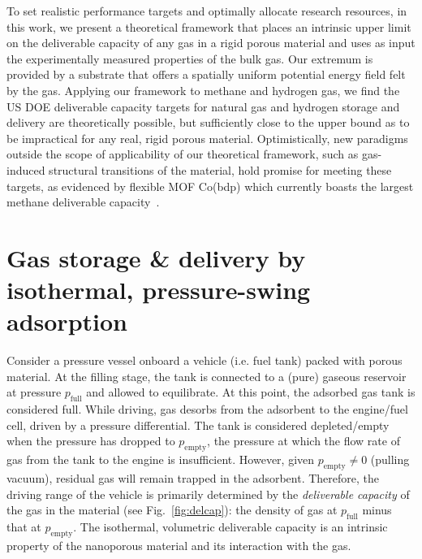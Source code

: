 \documentclass[twoside,twocolumn,9pt]{article}
\newcommand\pfull{\ensuremath{p_{\text{full}}}}
\newcommand\pempty{\ensuremath{p_{\text{empty}}}}
\begin{document}

To set realistic performance targets and optimally allocate research resources,
in this work, we present a theoretical framework that places an intrinsic upper
limit on the deliverable capacity of any gas in a rigid porous material and
uses as input the experimentally measured properties of the bulk gas. Our
extremum is provided by a substrate that offers a spatially uniform potential
energy field felt by the gas. Applying our framework to methane and hydrogen
gas, we find the US DOE deliverable capacity targets for natural gas and
hydrogen storage and delivery are theoretically possible, but sufficiently
close to the upper bound as to be impractical for any real, rigid porous
material. Optimistically, new paradigms outside the scope of applicability of
our theoretical framework, such as gas-induced structural transitions of the
material, hold promise for meeting these targets, as evidenced by flexible MOF
Co(bdp) which currently boasts the largest methane deliverable
capacity~\cite{mason2015methane}.

\section{Gas storage \& delivery by isothermal, pressure-swing adsorption}
Consider a pressure vessel onboard a vehicle (i.e. fuel tank) packed with
porous material. At the filling stage, the tank is connected to a (pure)
gaseous reservoir at pressure $\pfull$ and allowed to equilibrate. At this
point, the adsorbed gas tank is considered full. While driving, gas desorbs
from the adsorbent to the engine/fuel cell, driven by a pressure differential.
The tank is considered depleted/empty when the pressure has dropped to
$\pempty$, the pressure at which the flow rate of gas from the tank to the
engine is insufficient. However, given $\pempty \neq 0$ (pulling vacuum),
residual gas will remain trapped in the adsorbent. Therefore, the driving range
of the vehicle is primarily determined by the \emph{deliverable capacity} of
the gas in the material (see Fig.~\ref{fig:delcap}): the density of gas at
$\pfull$ minus that at $\pempty$. The isothermal, volumetric deliverable
capacity is an intrinsic property of the nanoporous material and its
interaction with the gas.
\end{document}

